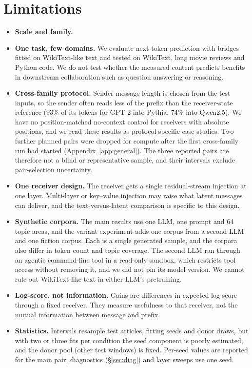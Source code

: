 \section{Limitations}
\label{sec:limitations}
\begin{itemize}
\item \textbf{Scale and family.} \XFAMILYLIMIT
\item \textbf{One task, few domains.} We evaluate next-token prediction with bridges fitted on WikiText-like text and tested on WikiText, long movie reviews and Python code. We do not test whether the measured content predicts benefits in downstream collaboration such as question answering or reasoning.
\item \textbf{Cross-family protocol.} Sender message length is chosen from the test inputs, so the sender often reads less of the prefix than the receiver-state reference (93\% of its tokens for GPT-2 into Pythia, 74\% into Qwen2.5). We have no position-matched no-context control for receivers with absolute positions, and we read these results as protocol-specific case studies. Two further planned pairs were dropped for compute after the first cross-family run had started (Appendix~\ref{app:general}). The three reported pairs are therefore not a blind or representative sample, and their intervals exclude pair-selection uncertainty.
\item \textbf{One receiver design.} The receiver gets a single residual-stream injection at one layer. Multi-layer or key--value injection may raise what latent messages can deliver, and the text-versus-latent comparison is specific to this design.
\item \textbf{Synthetic corpora.} The main results use one LLM, one prompt and 64 topic areas, and the variant experiment adds one corpus from a second LLM and one fiction corpus. Each is a single generated sample, and the corpora also differ in token count and topic coverage. The second LLM ran through an agentic command-line tool in a read-only sandbox, which restricts tool access without removing it, and we did not pin its model version. We cannot rule out WikiText-like text in either LLM's pretraining.
\item \textbf{Log-score, not information.} Gains are differences in expected log-score through a fixed receiver. They measure usefulness to that receiver, not the mutual information between message and prefix.
\item \textbf{Statistics.} Intervals resample test articles, fitting seeds and donor draws, but with two or three fits per condition the seed component is poorly estimated, and the donor pool (other test windows) is fixed. Per-seed values are reported for the main pair; diagnostics (\S\ref{sec:diag}) and layer sweeps use one seed. \SCALESEEDS
\end{itemize}
